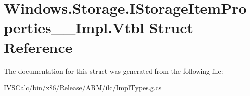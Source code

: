 \hypertarget{struct_windows_1_1_storage_1_1_i_storage_item_properties_____impl_1_1_vtbl}{}\section{Windows.\+Storage.\+I\+Storage\+Item\+Properties\+\_\+\+\_\+\+Impl.\+Vtbl Struct Reference}
\label{struct_windows_1_1_storage_1_1_i_storage_item_properties_____impl_1_1_vtbl}


The documentation for this struct was generated from the following file\+:\begin{DoxyCompactItemize}
\item 
I\+V\+S\+Calc/bin/x86/\+Release/\+A\+R\+M/ilc/Impl\+Types.\+g.\+cs\end{DoxyCompactItemize}
